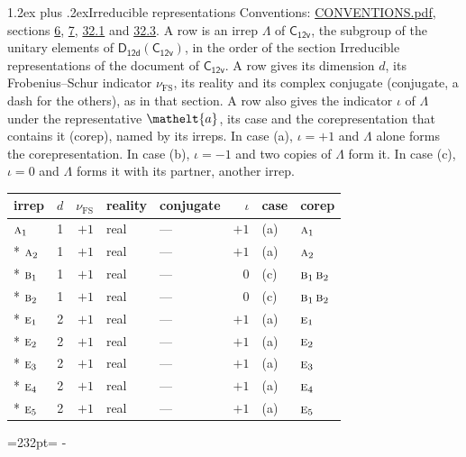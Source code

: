 \documentclass[10pt,a4paper]{article}
\makeatletter
\renewcommand\section{\@startsection{section}{1}{\z@}{-3ex plus -1ex minus -.2ex}%
  {1.2ex plus .2ex}{\normalfont\large\sffamily\bfseries\color{parttitle}}}
\newcommand{\needspace}[1]{\par\penalty-100\begingroup\dimen0=#1\relax\dimen2=\pagegoal
  \advance\dimen2-\pagetotal\ifdim\dimen0>\dimen2\relax\ifdim\dimen2>0pt\vfil\break\fi\fi
  \endgroup}
\numberwithin{equation}{section}
\newcommand{\eltfont}[1]{{\let\sigma\eltsigma\mathelt{#1}}}
\newcommand{\grp}[1]{\mathsf{#1}}
\newcommand{\irr}[1]{\text{\normalfont\scshape #1}}
\newcommand{\elt}[1]{\eltfont{#1}}
\newcommand{\fsind}{\nu_{\mathrm{FS}}}
\makeatother
\begin{document}
\section{Irreducible representations}\label{s:irreps}
Conventions: \href{../../CONVENTIONS.pdf}{CONVENTIONS.pdf}, sections \href{../../../rotation/CONVENTIONS.pdf\#conv.6}{6}, \href{../../../rotation/CONVENTIONS.pdf\#conv.7}{7}, \href{../../CONVENTIONS.pdf\#conv.32.1}{32.1} and \href{../../CONVENTIONS.pdf\#conv.32.3}{32.3}.
\leavevmode\label{n:irrep.Delta}A row is an irrep $\Lambda$ of $\grp{C_{12v}}$, the subgroup of the unitary elements of $\grp{D_{12d}}(\grp{C_{12v}})$, in the order of the section Irreducible representations of the document of \href{../../../rotation/data/pdf/C12v.pdf}{$\grp{C_{12v}}$}. \label{n:index.dimension}\label{n:index.frobenius}\label{n:head.irrep}\label{n:head.reality}\label{n:head.conjugate}A row gives its dimension $d$, its Frobenius--Schur indicator $\fsind$, its reality and its complex conjugate (conjugate, a dash for the others), as in that section. \label{n:head.case.corep}\label{n:head.corep}A row also gives the indicator $\iota$ of $\Lambda$ under the representative $\elt{a}$, its case and the corepresentation that contains it (corep), named by its irreps. In case (a), $\iota = +1$ and $\Lambda$ alone forms the corepresentation. In case (b), $\iota = -1$ and two copies of $\Lambda$ form it. In case (c), $\iota = 0$ and $\Lambda$ forms it with its partner, another irrep.
\setlength{\emergencystretch}{2em}\par\setlength{\emergencystretch}{0pt}
{\small\renewcommand{\arraystretch}{1.25}\setlength{\tabcolsep}{4pt}\begin{longtable}{@{}lrrllrll@{}}\toprule
irrep & $d$ & $\fsind$ & reality & conjugate & $\iota$ & case & corep\\\midrule\endhead
\bottomrule\endfoot\endlastfoot
$\irr{a}_{1}$ & 1 & $+1$ & real & --- & $+1$ & (a) & $\irr{a}_{1}$\\*
$\irr{a}_{2}$ & 1 & $+1$ & real & --- & $+1$ & (a) & $\irr{a}_{2}$\\*
$\irr{b}_{1}$ & 1 & $+1$ & real & --- & $0$ & (c) & $\irr{b}_{1}\,\irr{b}_{2}$\\*
$\irr{b}_{2}$ & 1 & $+1$ & real & --- & $0$ & (c) & $\irr{b}_{1}\,\irr{b}_{2}$\\*
$\irr{e}_{1}$ & 2 & $+1$ & real & --- & $+1$ & (a) & $\irr{e}_{1}$\\*
$\irr{e}_{2}$ & 2 & $+1$ & real & --- & $+1$ & (a) & $\irr{e}_{2}$\\*
$\irr{e}_{3}$ & 2 & $+1$ & real & --- & $+1$ & (a) & $\irr{e}_{3}$\\*
$\irr{e}_{4}$ & 2 & $+1$ & real & --- & $+1$ & (a) & $\irr{e}_{4}$\\*
$\irr{e}_{5}$ & 2 & $+1$ & real & --- & $+1$ & (a) & $\irr{e}_{5}$\\
\bottomrule\end{longtable}}
\needspace{232pt}
\end{document}

